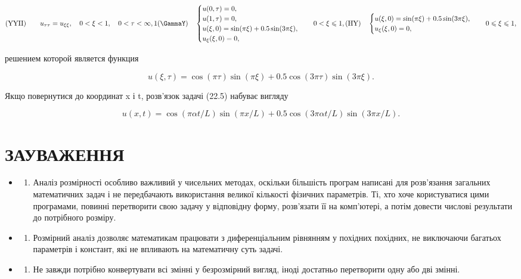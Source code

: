 \documentclass[
  ukrainian,
]{article}
\providecommand{\tightlist}{%
  \setlength{\itemsep}{0pt}\setlength{\parskip}{0pt}}
\begin{document}
\[
(\text{YYII}) \qquad u_{\tau\tau} = u_{\xi\xi}, \quad 0 < \xi < 1, \quad 0 < \tau < \infty, 1
(\text{\GammaY}) \quad
\begin{cases} u(0, \tau) = 0, \\ u(1, \tau) = 0, \\ u(\xi, 0) = \sin(\pi\xi) + 0.5\sin(3\pi\xi), \\ u_{\xi}(\xi, 0) = 0, \end{cases}
\quad 0 < \xi \leqslant 1,
(\text{HY}) \quad
\begin{cases} u(\xi, 0) = \sin(\pi\xi) + 0.5\sin(3\pi\xi), \\ u_{\xi}(\xi, 0) = 0, \end{cases}
\quad 0 \leqslant \xi \leqslant 1,
\]

решением которой является функция

\[
u(\xi, \tau) = \cos(\pi \tau) \sin(\pi \xi) + 0.5 \cos(3\pi \tau) \sin(3\pi \xi).
\]

Якщо повернутися до координат x і t, розв'язок задачі (22.5) набуває
вигляду

\[
u(x, t) = \cos(\pi \alpha t/L)\sin(\pi x/L) + 0.5\cos(3\pi \alpha t/L)\sin(3\pi x/L).
\]

\section{ЗАУВАЖЕННЯ}\label{ux437ux430ux443ux432ux430ux436ux435ux43dux43dux44f-8}

\begin{itemize}
\tightlist
\item
  \begin{enumerate}
  \def\labelenumi{\arabic{enumi}.}
  \tightlist
  \item
    Аналіз розмірності особливо важливий у чисельних методах, оскільки
    більшість програм написані для розв'язання загальних математичних
    задач і не передбачають використання великої кількості фізичних
    параметрів. Ті, хто хоче користуватися цими програмами, повинні
    перетворити свою задачу у відповідну форму, розв'язати її на
    комп'ютері, а потім довести числові результати до потрібного
    розміру.
  \end{enumerate}
\item
  \begin{enumerate}
  \def\labelenumi{\arabic{enumi}.}
  \setcounter{enumi}{1}
  \tightlist
  \item
    Розмірний аналіз дозволяє математикам працювати з диференціальним
    рівнянням у похідних похідних, не виключаючи багатьох параметрів і
    констант, які не впливають на математичну суть задачі.
  \end{enumerate}
\item
  \begin{enumerate}
  \def\labelenumi{\arabic{enumi}.}
  \setcounter{enumi}{2}
  \tightlist
  \item
    Не завжди потрібно конвертувати всі змінні у безрозмірний вигляд,
    іноді достатньо перетворити одну або дві змінні.
  \end{enumerate}
\end{itemize}
\end{document}

